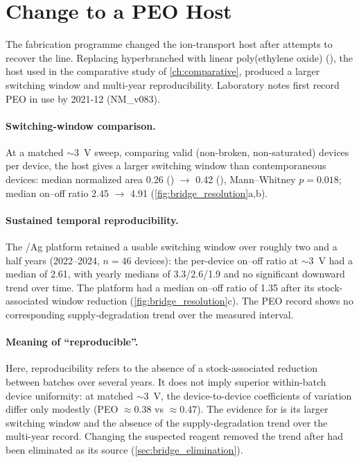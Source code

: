 \documentclass[12pt, twoside]{report}
\begin{document}
\FloatBarrier  %
\section{Change to a PEO Host}\label{sec:bridge_resolution}

The fabrication programme changed the ion-transport host after attempts to recover the \Hybrane{} line. Replacing hyperbranched \Hybrane{} with linear poly(ethylene oxide) (\PEO{}), the host used in the comparative study of \cref{ch:comparative}, produced a larger switching window and multi-year reproducibility. Laboratory notes first record PEO in use by 2021-12 (NM\_v083).

\paragraph{Switching-window comparison.} At a matched $\sim$\SI{3}{\volt} sweep, comparing valid (non-broken, non-saturated) devices per device, the \PEO{} host gives a larger switching window than contemporaneous \Hybrane{} devices: median normalized area \num{0.26} (\Hybrane{}) $\to$ \num{0.42} (\PEO{}), Mann--Whitney $p=0.018$; median on--off ratio \num{2.45} $\to$ \num{4.91} (\cref{fig:bridge_resolution}a,b).

\paragraph{Sustained temporal reproducibility.} The \PEO{}/Ag platform retained a usable switching window over roughly two and a half years (2022--2024, $n=46$ devices): the per-device on--off ratio at $\sim$\SI{3}{\volt} had a median of \num{2.61}, with yearly medians of \num{3.3}/\num{2.6}/\num{1.9} and no significant downward trend over time. The \Hybrane{} platform had a median on--off ratio of \num{1.35} after its stock-associated window reduction (\cref{fig:bridge_resolution}c). The PEO record shows no corresponding supply-degradation trend over the measured interval.

\paragraph{Meaning of ``reproducible''.} Here, reproducibility refers to the absence of a stock-associated reduction between batches over several years. It does not imply superior within-batch device uniformity: at matched $\sim$\SI{3}{\volt}, the device-to-device coefficients of variation differ only modestly (PEO $\approx$\num{0.38} vs \Hybrane{} $\approx$\num{0.47}). The evidence for \PEO{} is its larger switching window and the absence of the supply-degradation trend over the multi-year record. Changing the suspected \Hybrane{} reagent removed the trend after \SY{} had been eliminated as its source (\cref{sec:bridge_elimination}).
\end{document}
